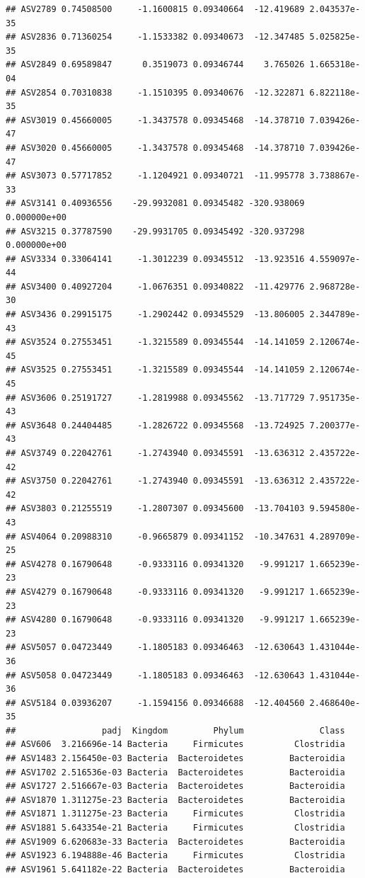 \documentclass[]{article}
\begin{document}
\begin{verbatim}
## ASV2789 0.74508500     -1.1600815 0.09340664  -12.419689 2.043537e-35
## ASV2836 0.71360254     -1.1533382 0.09340673  -12.347485 5.025825e-35
## ASV2849 0.69589847      0.3519073 0.09346744    3.765026 1.665318e-04
## ASV2854 0.70310838     -1.1510395 0.09340676  -12.322871 6.822118e-35
## ASV3019 0.45660005     -1.3437578 0.09345468  -14.378710 7.039426e-47
## ASV3020 0.45660005     -1.3437578 0.09345468  -14.378710 7.039426e-47
## ASV3073 0.57717852     -1.1204921 0.09340721  -11.995778 3.738867e-33
## ASV3141 0.40936556    -29.9932081 0.09345482 -320.938069 0.000000e+00
## ASV3215 0.37787590    -29.9931705 0.09345492 -320.937298 0.000000e+00
## ASV3334 0.33064141     -1.3012239 0.09345512  -13.923516 4.559097e-44
## ASV3400 0.40927204     -1.0676351 0.09340822  -11.429776 2.968728e-30
## ASV3436 0.29915175     -1.2902442 0.09345529  -13.806005 2.344789e-43
## ASV3524 0.27553451     -1.3215589 0.09345544  -14.141059 2.120674e-45
## ASV3525 0.27553451     -1.3215589 0.09345544  -14.141059 2.120674e-45
## ASV3606 0.25191727     -1.2819988 0.09345562  -13.717729 7.951735e-43
## ASV3648 0.24404485     -1.2826722 0.09345568  -13.724925 7.200377e-43
## ASV3749 0.22042761     -1.2743940 0.09345591  -13.636312 2.435722e-42
## ASV3750 0.22042761     -1.2743940 0.09345591  -13.636312 2.435722e-42
## ASV3803 0.21255519     -1.2807307 0.09345600  -13.704103 9.594580e-43
## ASV4064 0.20988310     -0.9665879 0.09341152  -10.347631 4.289709e-25
## ASV4278 0.16790648     -0.9333116 0.09341320   -9.991217 1.665239e-23
## ASV4279 0.16790648     -0.9333116 0.09341320   -9.991217 1.665239e-23
## ASV4280 0.16790648     -0.9333116 0.09341320   -9.991217 1.665239e-23
## ASV5057 0.04723449     -1.1805183 0.09346463  -12.630643 1.431044e-36
## ASV5058 0.04723449     -1.1805183 0.09346463  -12.630643 1.431044e-36
## ASV5184 0.03936207     -1.1594156 0.09346688  -12.404560 2.468640e-35
##                 padj  Kingdom         Phylum               Class
## ASV606  3.216696e-14 Bacteria     Firmicutes          Clostridia
## ASV1483 2.156450e-03 Bacteria  Bacteroidetes         Bacteroidia
## ASV1702 2.516536e-03 Bacteria  Bacteroidetes         Bacteroidia
## ASV1727 2.516667e-03 Bacteria  Bacteroidetes         Bacteroidia
## ASV1870 1.311275e-23 Bacteria  Bacteroidetes         Bacteroidia
## ASV1871 1.311275e-23 Bacteria     Firmicutes          Clostridia
## ASV1881 5.643354e-21 Bacteria     Firmicutes          Clostridia
## ASV1909 6.620683e-33 Bacteria  Bacteroidetes         Bacteroidia
## ASV1923 6.194888e-46 Bacteria     Firmicutes          Clostridia
## ASV1961 5.641182e-22 Bacteria  Bacteroidetes         Bacteroidia

\end{verbatim}
\end{document}
